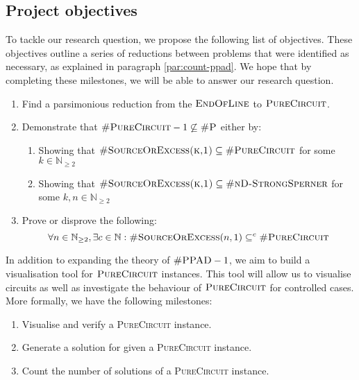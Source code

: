 \subsection{Project objectives}

To tackle our research question, we propose the following list of objectives. 
These objectives outline a series of reductions between problems that were identified as necessary,
as explained in paragraph \ref{par:count-ppad}.
We hope that by completing these milestones, we will be able to answer our research question.

\begin{enumerate}[label*=R.\arabic*)]
    \item Find a parsimonious reduction from the $\textsc{EndOfLine}$ to $\textsc{PureCircuit}$.
    \item Demonstrate that $\textsc{\#PureCircuit}- 1 \not\subseteq \textsc{\#P}$ either by:
        \begin{enumerate}
            \item Showing that $\textsc{\#SourceOrExcess(k,1)} \subseteq \textsc{\#PureCircuit}$ for some $k \in \mathbb{N}_{\geq 2}$
            \item Showing that $\textsc{\#SourceOrExcess(k,1)} \subseteq \textsc{\#nD-StrongSperner}$ for some $k,n \in \mathbb{N}_{\geq 2}$ 
        \end{enumerate}
    \item Prove or disprove the following:
\[
\forall n \in \mathbb{N}_{\geq 2}, \exists c \in \mathbb{N}:  \textnormal{\textsc{\#SourceOrExcess}}(n, 1) \subseteq^c \textnormal{\textsc{\#PureCircuit}}
\]

\end{enumerate}

In addition to expanding the theory of $\textsc{\#PPAD} -1$, we aim to build
a visualisation tool for $\textsc{PureCircuit}$ instances. This tool
will allow us to visualise circuits as well as investigate the behaviour
of $\textsc{PureCircuit}$ for controlled cases. More formally,
we have the following milestones:

\begin{enumerate}[label=S.\arabic*)]
    \item Visualise and verify a \textsc{PureCircuit} instance.
    \item Generate a solution for given a \textsc{PureCircuit} instance.
    \item Count the number of solutions of a \textsc{PureCircuit} instance.
\end{enumerate}

